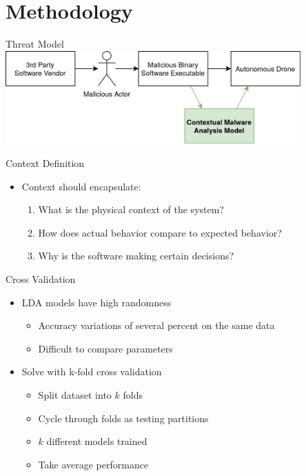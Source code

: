 \documentclass[handout,11pt]{beamer}
\begin{document}
	\section{Methodology}
	\begin{frame}{Threat Model}
		\centering
		\includegraphics[width=0.85\textwidth]{img/threat_model.png}
	\end{frame}
	\begin{frame}{Context Definition}
		\begin{itemize}
			\item Context should encapsulate:
				\begin{enumerate}
					\item What is the physical context of the system?
					\item How does actual behavior compare to expected behavior?
					\item Why is the software making certain decisions?
				\end{enumerate}
		\end{itemize}
	\end{frame}
	\begin{frame}{Cross Validation}
		\begin{itemize}
			\item LDA models have high randomness
				\begin{itemize}
					\item Accuracy variations of several percent on the same data
					\item Difficult to compare parameters
				\end{itemize}
			\item Solve with k-fold cross validation
				\begin{itemize}
					\item Split dataset into $k$ folds
					\item Cycle through folds as testing partitions
					\item $k$ different models trained
					\item Take average performance
				\end{itemize}
		\end{itemize}
	\end{frame}
\end{document}
